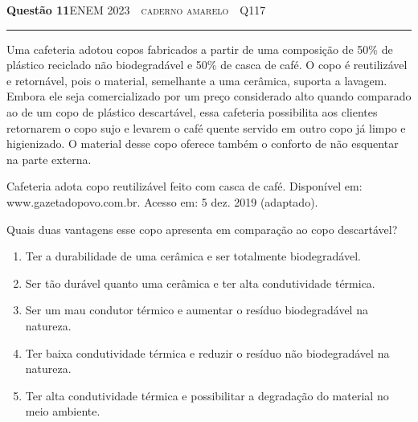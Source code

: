 \documentclass[11pt,a4paper]{article}
\newcommand{\fonte}[1]{{\small\scshape\color{grafite}#1}}
\newenvironment{questao}[2]{%
  \needspace{6\baselineskip}
  \par\addvspace{1.6em}
  {\large\bfseries\color{vinho}Quest\~ao #1}\hfill #2\\[-0.55em]
  {\color{black!25}\rule{\linewidth}{0.4pt}}
  \par\nobreak\smallskip
}{\par\addvspace{0.4em}}
\newcommand{\fontebib}[1]{{\raggedleft\scriptsize\color{grafite}#1\par}}
\begin{document}
\begin{questao}{11}{\fonte{ENEM 2023 \,\textperiodcentered\, caderno amarelo \,\textperiodcentered\, Q117}}
Uma cafeteria adotou copos fabricados a partir de uma composi\c{c}\~ao de
50\% de pl\'astico reciclado n\~ao biodegrad\'avel e 50\% de casca de caf\'e.
O copo \'e reutiliz\'avel e retorn\'avel, pois o material, semelhante a uma
cer\^amica, suporta a lavagem. Embora ele seja comercializado por um
pre\c{c}o considerado alto quando comparado ao de um copo de pl\'astico
descart\'avel, essa cafeteria possibilita aos clientes retornarem o copo
sujo e levarem o caf\'e quente servido em outro copo j\'a limpo e
higienizado. O material desse copo oferece tamb\'em o conforto de n\~ao
esquentar na parte externa.

\fontebib{Cafeteria adota copo reutiliz\'avel feito com casca de caf\'e.
Dispon\'ivel em: www.gazetadopovo.com.br. Acesso em: 5 dez. 2019
(adaptado).}

Quais duas vantagens esse copo apresenta em compara\c{c}\~ao ao copo
descart\'avel?
\begin{enumerate}
  \item Ter a durabilidade de uma cer\^amica e ser totalmente
        biodegrad\'avel.
  \item Ser t\~ao dur\'avel quanto uma cer\^amica e ter alta condutividade
        t\'ermica.
  \item Ser um mau condutor t\'ermico e aumentar o res\'iduo biodegrad\'avel
        na natureza.
  \item Ter baixa condutividade t\'ermica e reduzir o res\'iduo n\~ao
        biodegrad\'avel na natureza.
  \item Ter alta condutividade t\'ermica e possibilitar a degrada\c{c}\~ao do
        material no meio ambiente.
\end{enumerate}
\end{questao}
\end{document}
